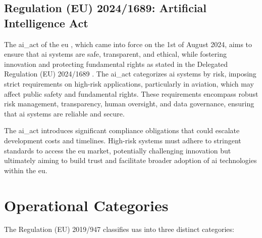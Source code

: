 \subsection{Regulation (EU) 2024/1689: Artificial Intelligence Act}
The \gls{ai_act} of the \gls{eu} \autocite{AIActIntoForce}, which came into force on the 1st of August 2024, aims to ensure that \gls{ai} systems are safe, transparent, and ethical, while fostering innovation and protecting fundamental rights as stated in the Delegated Regulation (EU) 2024/1689 \autocite{eu-1689-2024}. The \gls{ai_act} categorizes \gls{ai} systems by risk, imposing strict requirements on high-risk applications, particularly in aviation, which may affect public safety and fundamental rights. These requirements encompass robust risk management, transparency, human oversight, and data governance, ensuring that \gls{ai} systems are reliable and secure.

The \gls{ai_act} introduces significant compliance obligations that could escalate development costs and timelines. High-risk systems must adhere to stringent standards to access the \gls{eu} market, potentially challenging innovation but ultimately aiming to build trust and facilitate broader adoption of \gls{ai} technologies within the \gls{eu}.

\section{Operational Categories}
The Regulation (EU) 2019/947 \autocite{eu-947-2019} classifies \gls{uas} into three distinct categories:

